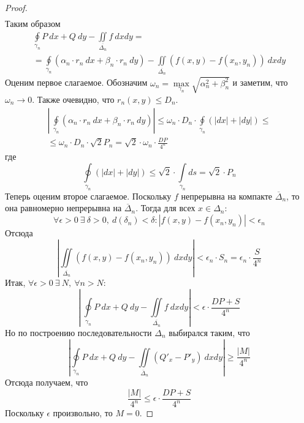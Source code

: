 \begin{proof}
\begin{multline*}
    \end{multline*}
    Таким образом
    \begin{multline*}
        \oint\limits_{\gamma_n}P\ dx+Q\ dy-\iint\limits_{\overline{\Delta_n}}f\ dxdy=\\
        =\oint\limits_{\gamma_n}(\alpha_n\cdot r_n\ dx+\beta_n\cdot r_n\ dy)-\iint\limits_{\overline{\Delta_n}}(f(x,y)-f(x_n,y_n))\ dxdy
    \end{multline*}
    Оценим первое слагаемое. Обозначим $\omega_n=\max\limits_{\gamma_n}\sqrt{\alpha_n^2+\beta_n^2}$ и заметим, что\\
    $\omega_n\to 0$. Также очевидно, что $r_n(x,y)\leq D_n$. 
    \begin{multline*}
        \left|\ \oint\limits_{\gamma_n}(\alpha_n\cdot r_n\ dx+\beta_n\cdot r_n\ dy)\right|\leq \omega_n\cdot D_n\cdot \oint\limits_{\gamma_n}\left(|dx|+|dy|\right)\leq\\
        \leq \omega_n\cdot D_n\cdot \sqrt{2}P_n=\sqrt{2}\cdot \omega_n\cdot \frac{DP}{4^n}
    \end{multline*}
    где
    \[\oint\limits_{\gamma_n}\left(|dx|+|dy|\right)\leq \sqrt{2}\cdot \int\limits_{\gamma_n}ds=\sqrt{2}\cdot P_n\]
    Теперь оценим второе слагаемое. Поскольку $f$ непрерывна на компакте $\overline{\Delta}_n$, то она равномерно непрерывна на $\overline{\Delta}_n$. Тогда для всех $x\in \Delta_n$:
    \[\forall \epsilon>0\ \exists\ \delta>0,\ d(\delta_n)<\delta: |f(x,y)-f(x_n,y_n)|<\epsilon_n\]
    Отсюда
    \[\left|\iint\limits_{\overline{\Delta_n}}(f(x,y)-f(x_n,y_n))\ dxdy\right|<\epsilon_n\cdot S_n=\epsilon_n\cdot \frac{S}{4^n}\]
    Итак, $\forall \epsilon>0\ \exists\ N,\ \forall n>N$:
    \[\left|\ \oint\limits_{\gamma_n}P\ dx+Q\ dy-\iint\limits_{\overline{\Delta_n}}f\ dxdy\right|<\epsilon\cdot \frac{DP+S}{4^n}\]
    Но по построению последовательности $\Delta_n$ выбирался таким, что
    \[\left|\oint\limits_{\gamma_n}P\ dx+Q\ dy-\iint\limits_{\overline{\Delta}_n}(Q'_x-P'_y)\ dxdy\right|\geq \frac{|M|}{4^n}\]
    Отсюда получаем, что
    \[\frac{|M|}{4^n}\leq \epsilon\cdot \frac{DP+S}{4^n}\]
    Поскольку $\epsilon$ произвольно, то $M=0$.
\end{proof}
